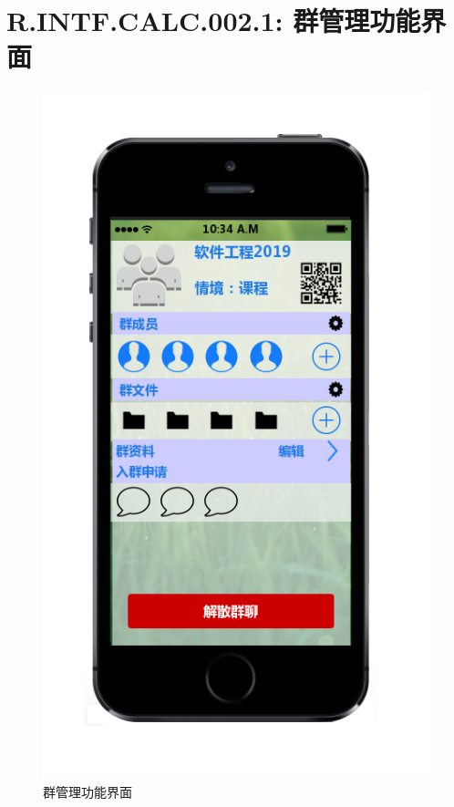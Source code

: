     \section{R.INTF.CALC.002.1: 群管理功能界面}
    \begin{figure}[h]
        \centering
        \includegraphics[scale=0.6]{OutlineDesign/figures/群管理功能界面.png}
        \caption{群管理功能界面}
        \label{fig:server_flow}
    \end{figure}
    \newpage
